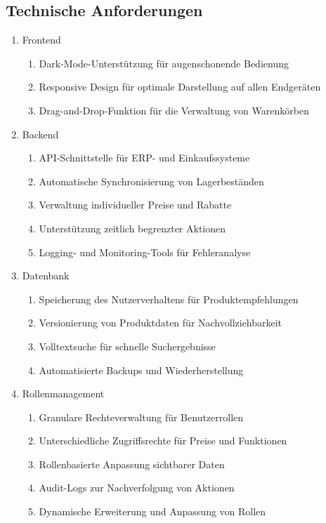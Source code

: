 \documentclass[%
	ngerman,
	12pt,
	a4paper
]{scrbook}
\begin{document}
	\subsection{Technische Anforderungen}
	\begin{enumerate}
		\item Frontend
		\begin{enumerate}
			\item Dark-Mode-Unterstützung für augenschonende Bedienung
			\item Responsive Design für optimale Darstellung auf allen Endgeräten
			\item Drag-and-Drop-Funktion für die Verwaltung von Warenkörben
		\end{enumerate}
		\item Backend
		\begin{enumerate}
			\item API-Schnittstelle für ERP- und Einkaufssysteme
			\item Automatische Synchronisierung von Lagerbeständen
			\item Verwaltung individueller Preise und Rabatte
			\item Unterstützung zeitlich begrenzter Aktionen
			\item Logging- und Monitoring-Tools für Fehleranalyse
		\end{enumerate}
		\item Datenbank
		\begin{enumerate}
			\item Speicherung des Nutzerverhaltens für Produktempfehlungen
			\item Versionierung von Produktdaten für Nachvollziehbarkeit
			\item Volltextsuche für schnelle Suchergebnisse
			\item Automatisierte Backups und Wiederherstellung
		\end{enumerate}
		\item Rollenmanagement
		\begin{enumerate}
			\item Granulare Rechteverwaltung für Benutzerrollen
			\item Unterschiedliche Zugriffsrechte für Preise und Funktionen
			\item Rollenbasierte Anpassung sichtbarer Daten
			\item Audit-Logs zur Nachverfolgung von Aktionen
			\item Dynamische Erweiterung und Anpassung von Rollen
		\end{enumerate}
	\end{enumerate}
\end{document}
